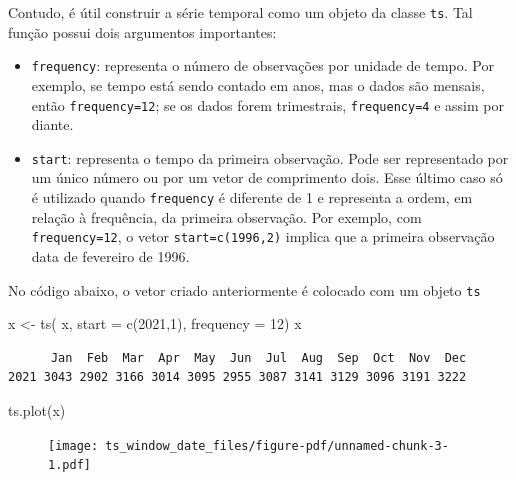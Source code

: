 \documentclass[
  letterpaper,
  DIV=11,
  numbers=noendperiod]{scrartcl}
\newenvironment{Shaded}{\begin{snugshade}}{\end{snugshade}}
\newcommand{\AttributeTok}[1]{\textcolor[rgb]{0.40,0.45,0.13}{#1}}
\newcommand{\DecValTok}[1]{\textcolor[rgb]{0.68,0.00,0.00}{#1}}
\newcommand{\FunctionTok}[1]{\textcolor[rgb]{0.28,0.35,0.67}{#1}}
\newcommand{\NormalTok}[1]{\textcolor[rgb]{0.00,0.23,0.31}{#1}}
\newcommand{\OtherTok}[1]{\textcolor[rgb]{0.00,0.23,0.31}{#1}}
\theoremstyle{plain}
\theoremstyle{plain}
\theoremstyle{definition}
\theoremstyle{definition}
\theoremstyle{remark}
\begin{document}
Contudo, é útil construir a série temporal como um objeto da classe
\texttt{ts}. Tal função possui dois argumentos importantes:

\begin{itemize}
\item
  \texttt{frequency}: representa o número de observações por unidade de
  tempo. Por exemplo, se tempo está sendo contado em anos, mas o dados
  são mensais, então \texttt{frequency=12}; se os dados forem
  trimestrais, \texttt{frequency=4} e assim por diante.
\item
  \texttt{start}: representa o tempo da primeira observação. Pode ser
  representado por um único número ou por um vetor de comprimento dois.
  Esse último caso só é utilizado quando \texttt{frequency} é diferente
  de 1 e representa a ordem, em relação à frequência, da primeira
  observação. Por exemplo, com \texttt{frequency=12}, o vetor
  \texttt{start=c(1996,2)} implica que a primeira observação data de
  fevereiro de 1996.
\end{itemize}

No código abaixo, o vetor criado anteriormente é colocado com um objeto
\texttt{ts}

\begin{Shaded}
\begin{Highlighting}[]
\NormalTok{x }\OtherTok{\textless{}{-}} \FunctionTok{ts}\NormalTok{( x, }\AttributeTok{start =} \FunctionTok{c}\NormalTok{(}\DecValTok{2021}\NormalTok{,}\DecValTok{1}\NormalTok{), }\AttributeTok{frequency =} \DecValTok{12}\NormalTok{)}
\NormalTok{x}
\end{Highlighting}
\end{Shaded}

\begin{verbatim}
      Jan  Feb  Mar  Apr  May  Jun  Jul  Aug  Sep  Oct  Nov  Dec
2021 3043 2902 3166 3014 3095 2955 3087 3141 3129 3096 3191 3222
\end{verbatim}

\begin{Shaded}
\begin{Highlighting}[]
\FunctionTok{ts.plot}\NormalTok{(x)}
\end{Highlighting}
\end{Shaded}

\begin{figure}[H]

{\centering \texttt{[image: ts\_window\_date\_files/figure-pdf/unnamed-chunk-3-1.pdf]}

}

\end{figure}
\end{document}

